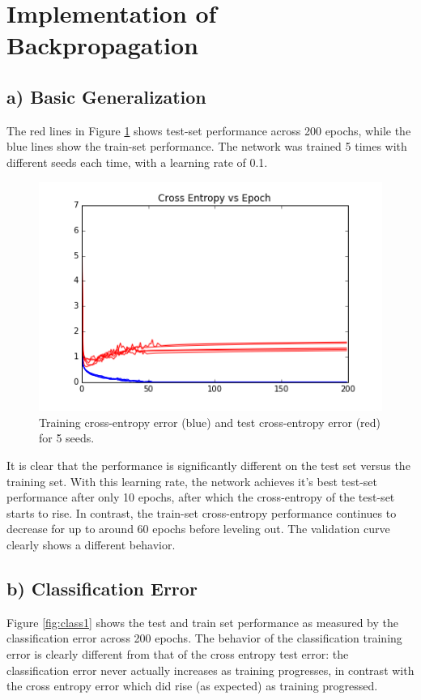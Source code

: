 \documentclass{article}
\begin{document}
\section{Implementation of Backpropagation}

\subsection{a) Basic Generalization}
The red lines in Figure \ref{fig:crosen1} shows test-set performance across 200 epochs, while the blue lines show the train-set performance. The network was trained 5 times with different seeds each time, with a learning rate of 0.1.  

\begin{figure}[h]
  \centering
  \includegraphics[scale=0.6]{../5a_crossentropy_vs_epoch_200.png} 
  \caption{Training cross-entropy error (blue) and test cross-entropy error (red) for 5 seeds.}
  \label{fig:crosen1}
\end{figure}

It is clear that the performance is significantly different on the test set versus the training set.  With this learning rate, the network achieves it's best test-set performance after only 10 epochs, after which the cross-entropy of the test-set starts to rise. In contrast, the train-set cross-entropy performance continues to decrease for up to around 60 epochs before leveling out. The validation curve clearly shows a different behavior.


\subsection{b) Classification Error}

Figure \ref{fig:class1} shows the test and train set performance as measured by the classification error across 200 epochs.  The behavior of the classification training error is clearly different from that of the cross entropy test error: the classification error never actually increases as training progresses, in contrast with the cross entropy error which did rise (as expected) as training progressed. 
\end{document}
